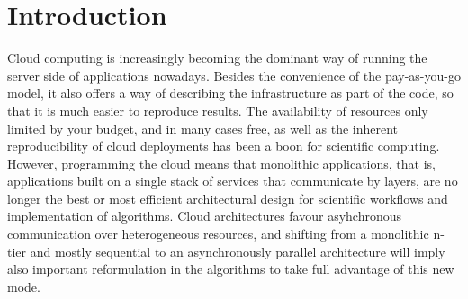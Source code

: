 \documentclass[sigconf]{acmart}
\begin{document}


\maketitle

\section{Introduction}

Cloud computing is increasingly becoming the dominant way of running
the server side of applications nowadays. Besides the convenience of the pay-as-you-go
model, it also offers a way of describing the infrastructure as part
of the code, so that it is much easier to reproduce results.
The availability of resources only limited by your budget, and in many
cases free, as well as the inherent reproducibility of cloud
deployments has been a boon for scientific computing. However,
programming the cloud means that monolithic applications, that is,
applications built on a single stack of services that communicate by
layers, are no longer the best or most efficient architectural design
for scientific workflows and implementation of algorithms. Cloud
architectures favour asyhchronous communication over heterogeneous
resources, and shifting from a monolithic n-tier and mostly sequential
to an asynchronously parallel architecture will imply also important
reformulation in the algorithms to take full advantage of this new
mode.
\end{document}
